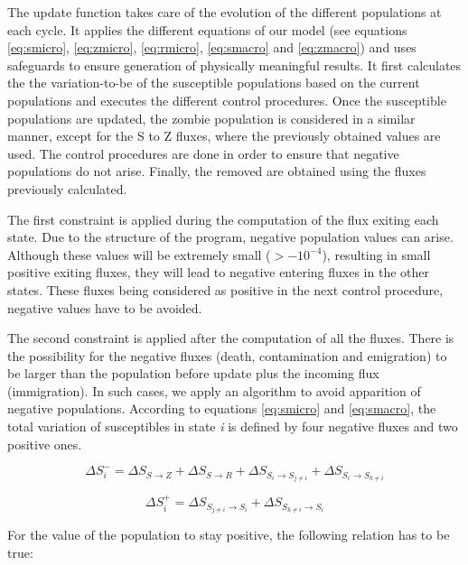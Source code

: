 \documentclass[11pt]{article} %
\begin{document}
The update function takes care of the evolution of the different populations at each cycle. It applies the different equations of our model (see equations \eqref{eq:smicro}, \eqref{eq:zmicro}, \eqref{eq:rmicro}, \eqref{eq:smacro} and \eqref{eq:zmacro}) and uses safeguards to ensure generation of physically meaningful results. It first calculates the the variation-to-be of the susceptible populations based on the current populations and executes the different control procedures. Once the susceptible populations are updated, the zombie population is considered in a similar manner, except for the S to Z fluxes, where the previously obtained values are used. The control procedures are done in order to ensure that negative populations do not arise. Finally, the removed are obtained using the fluxes previously calculated.

The first constraint is applied during the computation of the flux exiting each state. Due to the structure of the program, negative population values can arise. Although these values will be extremely small ($> - 10^{-4}$), resulting in small positive exiting fluxes, they will lead to negative entering fluxes in the other states. These fluxes being considered as positive in the next control procedure, negative values have to be avoided.

The second constraint is applied after the computation of all the fluxes. There is the possibility for the negative fluxes (death, contamination and emigration) to be larger than the population before update plus the incoming flux (immigration). In such cases, we apply an algorithm to avoid apparition of negative populations. According to equations \eqref{eq:smicro} and \eqref{eq:smacro}, the total variation of susceptibles in state \textit{i} is defined by four negative fluxes and two positive ones.

\bigskip
\begin{equation} \label{eq:delta-}
\Delta S_i^- = \Delta S_{S\rightarrow Z} + \Delta S_{S\rightarrow R} + \Delta S_{S_i\rightarrow S_{j\neq i}} + \Delta S_{S_i\rightarrow S_{k\neq i}}
\end{equation}

\begin{equation} \label{eq:delta+}
\Delta S_i^+ = \Delta S_{S_{j\neq i}\rightarrow S_i} + \Delta S_{S_{k\neq i}\rightarrow S_i}
\end{equation}
\bigskip

For the value of the population to stay positive, the following relation has to be true:
\end{document}
